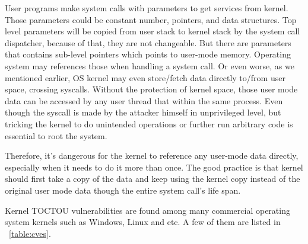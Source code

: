 User programs make system calls with parameters to get services from kernel. Those parameters could be constant number, pointers, and data structures. Top level parameters will be copied from user stack to kernel stack by the system call dispatcher, because of that, they are not changeable. But there are parameters that contains sub-level pointers which points to user-mode memory. Operating system may references those when handling a system call. Or even worse, as we mentioned earlier, OS kernel may even store/fetch data directly to/from user space, crossing syscalls. Without the protection of kernel space, those user mode data can be accessed by any user thread that within the same process. Even though the syscall is made by the attacker himself in unprivileged level, but tricking the kernel to do unintended operations or further run arbitrary code is essential to root the system.     

Therefore, it's dangerous for the kernel to reference any user-mode data directly, especially when it needs to do it more than once. The good practice is that kernel should first take a copy of the data and keep using the kernel copy instead of the original user mode data though the entire system call's life span.


Kernel TOCTOU vulnerabilities are found among many commercial operating system kernels such as Windows, Linux and etc. A few of them are listed in
~\autoref{table:cves}.


